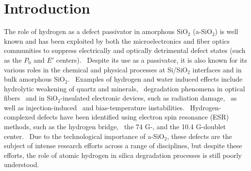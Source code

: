 \documentclass[aps,prb,reprint,superscriptaddress,showpacs]{revtex4-1}
\begin{document}
\keywords{}
\maketitle

\section{Introduction}

The role of hydrogen as a defect passivator in amorphous SiO$_2$ (a-SiO$_2$) is well known and has been exploited by both the microelectronics and fiber optics communities to suppress electrically and optically detrimental defect states (such as the $P_\mathrm{b}$ and $E'$ centers).~\cite{LENAHAN08} Despite its use as a passivator, it is also known for its various roles in the chemical and physical processes at Si/SiO$_2$ interfaces and in bulk amorphous SiO$_2$.~\cite{pobegen_h,cartier_depassivation,stathis_depassivation,hydrogen_ria,hydrogen_breakdown} Examples of hydrogen and water induced effects include hydrolytic weakening of quartz and minerals,~\cite{hobbs_h} degradation phenomena in optical fibers~\cite{griscom_fibers} and in SiO$_2$-insulated electronic devices, such as radiation damage,~\cite{revesz,mclean_radiation,griscom_radiation1} as well as injection-induced~\cite{dimaria_injection} and bias-temperature instabilities.~\cite{helms_bti,pobegen_h_nbti} Hydrogen-complexed defects have been identified using electron spin resonance (ESR) methods, such as the hydrogen bridge,~\cite{eprime_4_1,eprime_4_2} the 74 G-, and the 10.4 G-doublet center.~\cite{CONLEY92,LENAHAN08,kannan_hydrogen_epr} Due to the technological importance of a-SiO$_2$, these defects are the subject of intense research efforts across a range of disciplines, but despite these efforts, the role of atomic hydrogen in silica degradation processes is still poorly understood.
\end{document}
